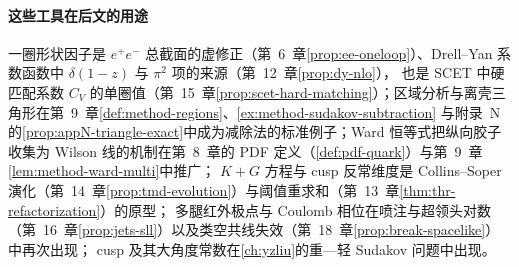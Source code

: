 \paragraph{这些工具在后文的用途}一圈形状因子是 $e^+e^-$ 总截面的虚修正（第~6~章\cref{prop:ee-oneloop}）、Drell--Yan 系数函数中 $\delta(1-z)$ 与 $\pi^2$ 项的来源（第~12~章\cref{prop:dy-nlo}），
也是 SCET 中硬匹配系数 $C_V$ 的单圈值（第~15~章\cref{prop:scet-hard-matching}）；区域分析与离壳三角形在第~9~章\cref{def:method-regions}、\cref{ex:method-sudakov-subtraction}
与附录~N 的\cref{prop:appN-triangle-exact}中成为减除法的标准例子；Ward 恒等式把纵向胶子收集为 Wilson 线的机制在第~8~章的 PDF 定义（\cref{def:pdf-quark}）与第~9~章\cref{lem:method-ward-multi}中推广；
$K+G$ 方程与 cusp 反常维度是 Collins--Soper 演化（第~14~章\cref{prop:tmd-evolution}）与阈值重求和（第~13~章\cref{thm:thr-refactorization}）的原型；
多腿红外极点与 Coulomb 相位在喷注与超领头对数（第~16~章\cref{prop:jets-sll}）以及类空共线失效（第~18~章\cref{prop:break-spacelike}）中再次出现；
cusp 及其大角度常数在\cref{ch:yzliu}的重—轻 Sudakov 问题中出现。
